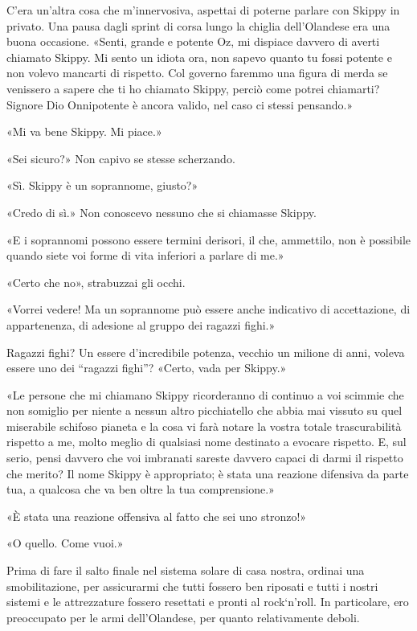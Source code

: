 C'era un'altra cosa che m'innervosiva, aspettai di poterne parlare con
Skippy in privato. Una pausa dagli sprint di corsa lungo la chiglia
dell'Olandese era una buona occasione. «Senti, grande e potente Oz, mi
dispiace davvero di averti chiamato Skippy. Mi sento un idiota ora, non
sapevo quanto tu fossi potente e non volevo mancarti di rispetto. Col
governo faremmo una figura di merda se venissero a sapere che ti ho
chiamato Skippy, perciò come potrei chiamarti? Signore Dio Onnipotente è
ancora valido, nel caso ci stessi pensando.»

«Mi va bene Skippy. Mi piace.»

«Sei sicuro?» Non capivo se stesse scherzando.

«Sì. Skippy è un soprannome, giusto?»

«Credo di sì.» Non conoscevo nessuno che si chiamasse Skippy.

«E i soprannomi possono essere termini derisori, il che, ammettilo, non
è possibile quando siete voi forme di vita inferiori a parlare di me.»

«Certo che no», strabuzzai gli occhi.

«Vorrei vedere! Ma un soprannome può essere anche indicativo di
accettazione, di appartenenza, di adesione al gruppo dei ragazzi fighi.»

Ragazzi fighi? Un essere d'incredibile potenza, vecchio un milione di
anni, voleva essere uno dei ``ragazzi fighi''? «Certo, vada per Skippy.»

«Le persone che mi chiamano Skippy ricorderanno di continuo a voi
scimmie che non somiglio per niente a nessun altro picchiatello che
abbia mai vissuto su quel miserabile schifoso pianeta e la cosa vi farà
notare la vostra totale trascurabilità rispetto a me, molto meglio di
qualsiasi nome destinato a evocare rispetto. E, sul serio, pensi davvero
che voi imbranati sareste davvero capaci di darmi il rispetto che
merito? Il nome Skippy è appropriato; è stata una reazione difensiva da
parte tua, a qualcosa che va ben oltre la tua comprensione.»

«È stata una reazione offensiva al fatto che sei uno stronzo!»

«O quello. Come vuoi.»

Prima di fare il salto finale nel sistema solare di casa nostra, ordinai
una smobilitazione, per assicurarmi che tutti fossero ben riposati e
tutti i nostri sistemi e le attrezzature fossero resettati e pronti al
rock`n'roll. In particolare, ero preoccupato per le armi dell'Olandese,
per quanto relativamente deboli.

